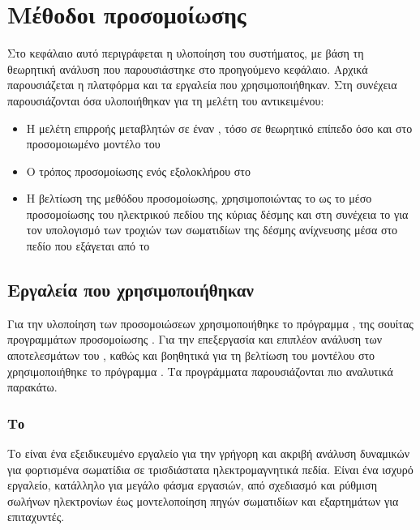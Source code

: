 \chapter{Μέθοδοι προσομοίωσης} \label{ch:simulation-methods}
Στο κεφάλαιο αυτό περιγράφεται η υλοποίηση του συστήματος, με βάση τη θεωρητική ανάλυση που παρουσιάστηκε στο προηγούμενο κεφάλαιο. 
Αρχικά παρουσιάζεται η πλατφόρμα και τα εργαλεία που χρησιμοποιήθηκαν.
Στη συνέχεια παρουσιάζονται όσα υλοποιήθηκαν για τη μελέτη του αντικειμένου:
\begin{itemize}
\item Η μελέτη επιρροής μεταβλητών σε έναν , τόσο σε θεωρητικό επίπεδο όσο και στο προσομοιωμένο μοντέλο του 
\item Ο τρόπος προσομοίωσης ενός  εξολοκλήρου στο 
\item Η βελτίωση της μεθόδου προσομοίωσης, χρησιμοποιώντας το  ως το μέσο προσομοίωσης του ηλεκτρικού πεδίου της κύριας δέσμης και στη συνέχεια το  για τον υπολογισμό των τροχιών των σωματιδίων της δέσμης ανίχνευσης μέσα στο πεδίο που εξάγεται από το 
\end{itemize}

\section{Εργαλεία που χρησιμοποιήθηκαν}
Για την υλοποίηση των προσομοιώσεων χρησιμοποιήθηκε το πρόγραμμα , της σουίτας προγραμμάτων προσομοίωσης . 
Για την επεξεργασία και επιπλέον ανάλυση των αποτελεσμάτων του , καθώς και βοηθητικά για τη βελτίωση του μοντέλου στο  χρησιμοποιήθηκε το πρόγραμμα . 
Τα προγράμματα παρουσιάζονται πιο αναλυτικά παρακάτω.

\subsection{Το }

Το  είναι ένα εξειδικευμένο εργαλείο για την γρήγορη και ακριβή ανάλυση δυναμικών για φορτισμένα σωματίδια σε τρισδιάστατα ηλεκτρομαγνητικά πεδία.
Είναι ένα ισχυρό εργαλείο, κατάλληλο για μεγάλο φάσμα εργασιών, από σχεδιασμό  και ρύθμιση σωλήνων ηλεκτρονίων έως μοντελοποίηση πηγών σωματιδίων και εξαρτημάτων για επιταχυντές.

